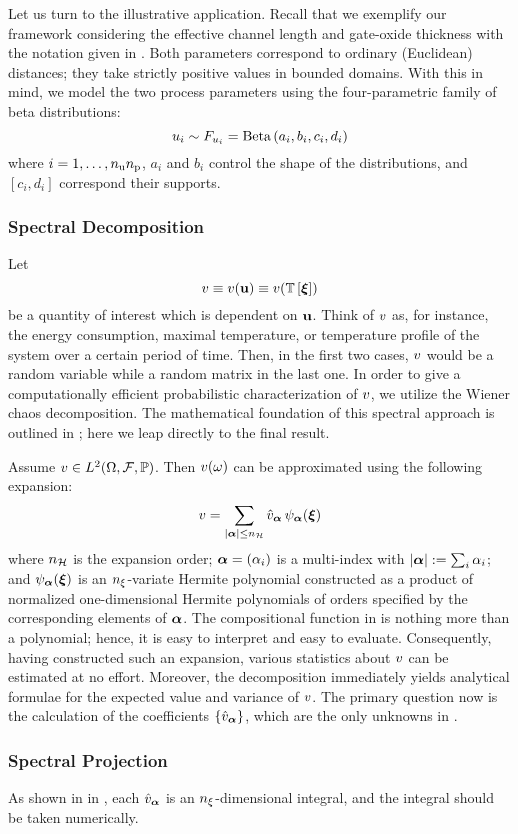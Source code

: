 Let us turn to the illustrative application.
Recall that we exemplify our framework considering the effective channel length and gate-oxide thickness with the notation given in .
Both parameters correspond to ordinary (Euclidean) distances; they take strictly positive values in bounded domains.
With this in mind, we model the two process parameters using the four-parametric family of beta distributions:
\begin{equation*}
  u_i \sim F_{u_i} = \text{Beta}\left( a_i, b_i, c_i, d_i \right)
\end{equation*}
where $i = 1, \dots, {n_\text{u}} {n_\text{p}}$, $a_i$ and $b_i$ control the shape of the distributions, and $[ c_i, d_i ]$ correspond their supports.

\subsubsection{Spectral Decomposition}
Let
\[
  \w \equiv \w(\vu) \equiv \w(\transformation{\vz})
\]
be a quantity of interest which is dependent on $\mathbf{u}$.
Think of $v$ as, for instance, the energy consumption, maximal temperature, or temperature profile of the system over a certain period of time.
Then, in the first two cases, $v$ would be a random variable while a random matrix in the last one.
In order to give a computationally efficient probabilistic characterization of $v$, we utilize the Wiener chaos decomposition.
The mathematical foundation of this spectral approach is outlined in ; here we leap directly to the final result.

Assume $v \in L^{2}(\Omega, \mathcal{F}, \mathbb{P})$.
Then $v(\omega)$ can be approximated using the following expansion:
\begin{equation} \elab{wiener-chaos-decomposition}
  \w = \sum_{|\multiindex| \leq \ncorder} \coefficient{\w}_{\multiindex} \, \polynomial_{\multiindex}(\vz)
\end{equation}
where ${n_\mathcal{H}}$ is the expansion order; $\bm{\alpha} = (\alpha_i)$ is a multi-index with $|\bm{\alpha}| := \sum_i \alpha_i$; and $\psi_{\bm{\alpha}}(\bm{\xi})$ is an ${n_\xi}$-variate Hermite polynomial constructed as a product of normalized one-dimensional Hermite polynomials of orders specified by the corresponding elements of $\bm{\alpha}$.
The compositional function in  is nothing more than a polynomial; hence, it is easy to interpret and easy to evaluate.
Consequently, having constructed such an expansion, various statistics about $v$ can be estimated at no effort.
Moreover, the decomposition immediately yields analytical formulae for the expected value and variance of $v$.
The primary question now is the calculation of the coefficients $\{ \hat{v}_{\bm{\alpha}} \}$, which are the only unknowns in .

\subsubsection{Spectral Projection}
As shown in  in , each $\hat{v}_{\bm{\alpha}}$ is an ${n_\xi}$-dimensional integral, and the integral should be taken numerically.
